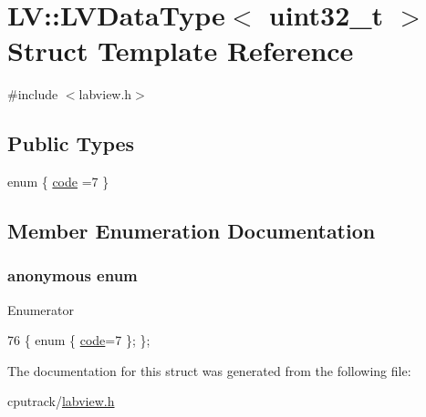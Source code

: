 \hypertarget{struct_l_v_1_1_l_v_data_type_3_01uint32__t_01_4}{}\section{LV\+:\+:L\+V\+Data\+Type$<$ uint32\+\_\+t $>$ Struct Template Reference}
\label{struct_l_v_1_1_l_v_data_type_3_01uint32__t_01_4}


{\ttfamily \#include $<$labview.\+h$>$}

\subsection*{Public Types}
\begin{DoxyCompactItemize}
\item 
enum \{ \hyperlink{struct_l_v_1_1_l_v_data_type_3_01uint32__t_01_4_a816ff7f79c7a7095c695447910b5ec0ca58348089a8889a568e3e55ff993d99df}{code} =7
 \}
\end{DoxyCompactItemize}


\subsection{Member Enumeration Documentation}
\subsubsection[{\texorpdfstring{anonymous enum}{anonymous enum}}]{\setlength{\rightskip}{0pt plus 5cm}anonymous enum}\hypertarget{struct_l_v_1_1_l_v_data_type_3_01uint32__t_01_4_a816ff7f79c7a7095c695447910b5ec0c}{}\label{struct_l_v_1_1_l_v_data_type_3_01uint32__t_01_4_a816ff7f79c7a7095c695447910b5ec0c}
\begin{Desc}
\item[Enumerator]\par
\begin{description}
\item[{\em 
code\hypertarget{struct_l_v_1_1_l_v_data_type_3_01uint32__t_01_4_a816ff7f79c7a7095c695447910b5ec0ca58348089a8889a568e3e55ff993d99df}{}\label{struct_l_v_1_1_l_v_data_type_3_01uint32__t_01_4_a816ff7f79c7a7095c695447910b5ec0ca58348089a8889a568e3e55ff993d99df}
}]\end{description}
\end{Desc}

\begin{DoxyCode}
76 \{ \textcolor{keyword}{enum} \{ \hyperlink{struct_l_v_1_1_l_v_data_type_3_01uint32__t_01_4_a816ff7f79c7a7095c695447910b5ec0ca58348089a8889a568e3e55ff993d99df}{code}=7 \}; \};
\end{DoxyCode}


The documentation for this struct was generated from the following file\+:\begin{DoxyCompactItemize}
\item 
cputrack/\hyperlink{labview_8h}{labview.\+h}\end{DoxyCompactItemize}
